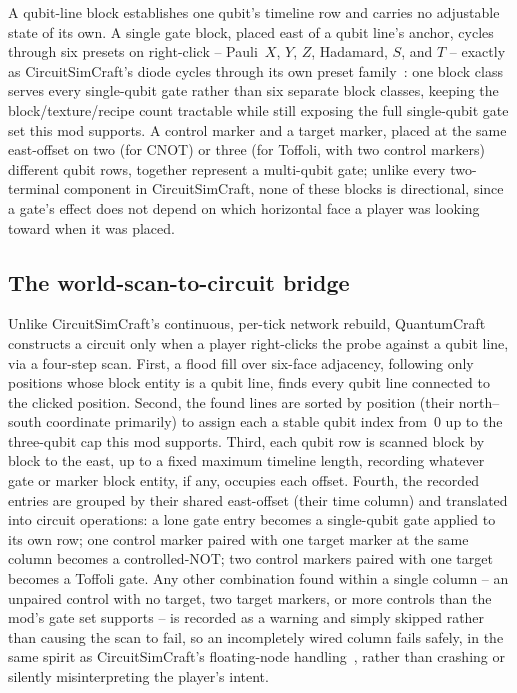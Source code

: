 A qubit-line block establishes one qubit's timeline row and carries no adjustable state of
its own. A single gate block, placed east of a qubit line's anchor, cycles through six
presets on right-click -- Pauli~$X$, $Y$, $Z$, Hadamard, $S$, and $T$ -- exactly as
CircuitSimCraft's diode cycles through its own preset family~\cite{picos2026circuitsimcraft}: one
block class serves every single-qubit gate rather than six separate block classes, keeping
the block/texture/recipe count tractable while still exposing the full single-qubit gate set
this mod supports. A control marker and a target marker, placed at the same east-offset on
two (for CNOT) or three (for Toffoli, with two control markers) different qubit rows,
together represent a multi-qubit gate; unlike every two-terminal component in
CircuitSimCraft, none of these blocks is directional, since a gate's effect does not depend on
which horizontal face a player was looking toward when it was placed.

\subsection{The world-scan-to-circuit bridge}

Unlike CircuitSimCraft's continuous, per-tick network rebuild, QuantumCraft constructs a circuit
only when a player right-clicks the probe against a qubit line, via a four-step scan.
First, a flood fill over six-face adjacency, following only positions whose block entity is a
qubit line, finds every qubit line connected to the clicked position. Second, the found lines
are sorted by position (their north--south coordinate primarily) to assign each a stable qubit
index from~0 up to the three-qubit cap this mod supports. Third, each qubit row is scanned
block by block to the east, up to a fixed maximum timeline length, recording whatever gate or
marker block entity, if any, occupies each offset. Fourth, the recorded entries are grouped by
their shared east-offset (their time column) and translated into circuit operations: a lone
gate entry becomes a single-qubit gate applied to its own row; one control marker paired with
one target marker at the same column becomes a controlled-NOT; two control markers paired
with one target becomes a Toffoli gate. Any other combination found within a single column --
an unpaired control with no target, two target markers, or more controls than the mod's
gate set supports -- is recorded as a warning and simply skipped rather than causing the scan
to fail, so an incompletely wired column fails safely, in the same spirit as CircuitSimCraft's
floating-node handling~\cite{picos2026circuitsimcraft}, rather than crashing or silently
misinterpreting the player's intent.

